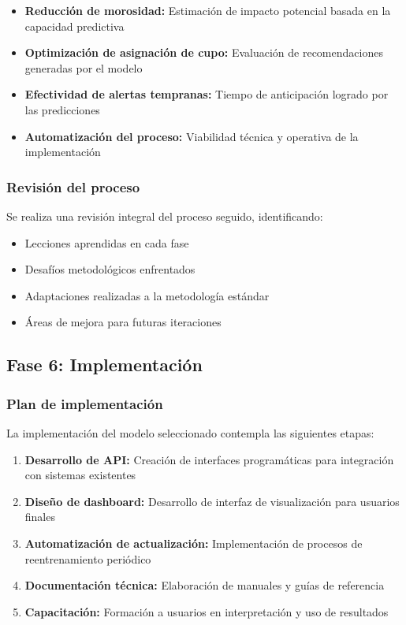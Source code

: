 \begin{itemize}
    \item \textbf{Reducción de morosidad:} Estimación de impacto potencial basada en la capacidad predictiva
    \item \textbf{Optimización de asignación de cupo:} Evaluación de recomendaciones generadas por el modelo
    \item \textbf{Efectividad de alertas tempranas:} Tiempo de anticipación logrado por las predicciones
    \item \textbf{Automatización del proceso:} Viabilidad técnica y operativa de la implementación
\end{itemize}

\subsubsection{Revisión del proceso}
Se realiza una revisión integral del proceso seguido, identificando:

\begin{itemize}
    \item Lecciones aprendidas en cada fase
    \item Desafíos metodológicos enfrentados
    \item Adaptaciones realizadas a la metodología estándar
    \item Áreas de mejora para futuras iteraciones
\end{itemize}

\subsection{Fase 6: Implementación}
\subsubsection{Plan de implementación}
La implementación del modelo seleccionado contempla las siguientes etapas:

\begin{enumerate}
    \item \textbf{Desarrollo de API:} Creación de interfaces programáticas para integración con sistemas existentes
    \item \textbf{Diseño de dashboard:} Desarrollo de interfaz de visualización para usuarios finales
    \item \textbf{Automatización de actualización:} Implementación de procesos de reentrenamiento periódico
    \item \textbf{Documentación técnica:} Elaboración de manuales y guías de referencia
    \item \textbf{Capacitación:} Formación a usuarios en interpretación y uso de resultados
\end{enumerate}

